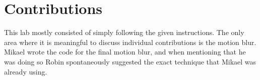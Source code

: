 \documentclass[a4paper,11pt]{article}
\begin{document}
\section*{Contributions}
This lab mostly consisted of simply following the given instructions. The only area where it is
meaningful to discuss individual contributions is the motion blur. Mikael wrote the code for the
final motion blur, and when mentioning that he was doing so Robin spontaneously suggested the exact
technique that Mikael was already using.
\end{document}
